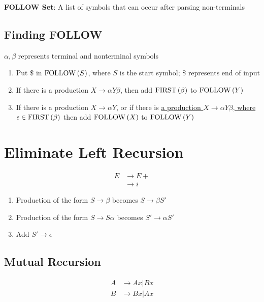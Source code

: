   \begin{definition}
    \textbf{FOLLOW Set}: A list of symbols that can occur after parsing
    non-terminals
  \end{definition}

  \subsection{Finding FOLLOW}

    $ \alpha, \beta $ represents terminal and nonterminal symbols

    \begin{enumerate}
      \item Put $ \$ $ in $ \operatorname{FOLLOW}\left( S \right) $, where $ S $ is the start
      symbol; $ \$ $ represents end of input
      \item If there is a production $ X \to \alpha Y \beta $, then add
      $ \operatorname{FIRST}\left( \beta \right) $ to $ \operatorname{FOLLOW}\left( Y \right) $
      \item If there is a production $ X \to \alpha Y $, or if there is \ul{a
      production $ X \to \alpha Y \beta $, where
      $ \epsilon \in \operatorname{FIRST}\left( \beta \right) $} then add
      $ \operatorname{FOLLOW}\left( X \right) $ to $ \operatorname{FOLLOW}\left( Y \right) $
    \end{enumerate}

\section{Eliminate Left Recursion}
\label{section: grammar/eliminate left recursion}

  \begin{align*}
    E &\to E+ \\
    &\to i
  \end{align*}

  \begin{enumerate}
    \item Production of the form $ S \to \beta $ becomes $ S \to \beta S' $
    \item Production of the form $ S \to S \alpha $ becomes $ S' \to \alpha S' $
    \item Add $ S' \to \epsilon $
  \end{enumerate}

  \subsection{Mutual Recursion}

    \begin{align*}
      A &\to Ax | Bx \\
      B &\to Bx | Ax
    \end{align*}


